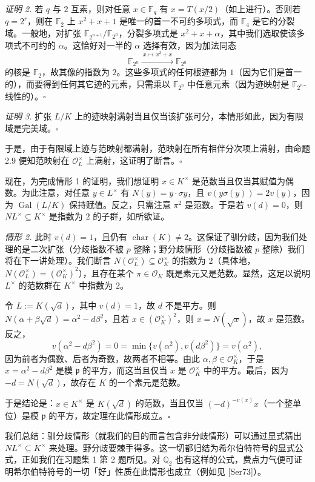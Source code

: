 \textit{证明 2.} 若 $q$ 与 $2$ 互素，则对任意 $x\in\mathbb{F}_q$ 有 $x=T(x/2)$（如上进行）。否则若 $q=2^r$，则在 $\mathbb{F}_2$ 上 $x^2+x+1$ 是唯一的首一不可约多项式，而 $\mathbb{F}_4$ 是它的分裂域。一般地，对扩张 $\mathbb{F}_{2^{n+1}}/\mathbb{F}_{2^n}$，分裂多项式是 $x^2+x+\alpha$，其中我们选取使该多项式不可约的 $\alpha$。这恰好对一半的 $\alpha$ 选择有效，因为加法同态
\[
  \mathbb{F}_{2^n}\xrightarrow{\ x\mapsto x^2+x\ }\mathbb{F}_{2^n}
\]
的核是 $\mathbb{F}_2$，故其像的指数为 $2$。这些多项式的任何根迹都为 $1$（因为它们是首一的），而要得到任何其它迹的元素，只需乘以 $\mathbb{F}_{2^n}$ 中任意元素（因为迹映射是 $\mathbb{F}_{2^n}$-线性的）。\hfill$\square$

\textit{证明 3.} 扩张 $L/K$ 上的迹映射满射当且仅当该扩张可分，本情形如此，因为有限域是完美域。\hfill$\square$

于是，由于有限域上迹与范映射都满射，范映射在所有相伴分次项上满射，由命题 2.9 便知范映射在 $\mathcal{O}_L^{\times}$ 上满射，这证明了断言。\hfill$\square$

现在，为完成情形 1 的证明，我们想证明 $x\in K^{\times}$ 是范数当且仅当其赋值为偶数。为此注意，对任意 $y\in L^{\times}$ 有 $N(y)=y\cdot\sigma y$，且 $v(y\sigma(y))=2v(y)$，因为 $\operatorname{Gal}(L/K)$ 保持赋值。反之，只需注意 $\pi^2$ 是范数。于是若 $v(d)=0$，则 $NL^{\times}\subseteq K^{\times}$ 是指数为 $2$ 的子群，如所欲证。

\emph{情形 2.} 此时 $v(d)=1$，且仍有 $\operatorname{char}(K)\neq 2$。这保证了驯分歧，因为我们处理的是二次扩张（分歧指数不被 $p$ 整除；野分歧情形（分歧指数被 $p$ 整除）我们将在下一讲处理）。我们断言 $N(\mathcal{O}_L^{\times})\subseteq\mathcal{O}_K^{\times}$ 的指数为 $2$（具体地，$N(\mathcal{O}_L^{\times})=(\mathcal{O}_K^{\times})^2$），且存在某个 $\pi\in\mathcal{O}_K$ 既是素元又是范数。显然，这足以说明 $L^{\times}$ 的范数群在 $K^{\times}$ 中指数为 $2$。

令 $L:=K(\sqrt{d})$，其中 $v(d)=1$，故 $d$ 不是平方。则 $N(\alpha+\beta\sqrt{d})=\alpha^2-d\beta^2$，且若 $x\in(\mathcal{O}_K^{\times})^2$，则 $x=N(\sqrt{x})$，故 $x$ 是范数。反之，
\[
  v(\alpha^2-d\beta^2)=0=\min\{v(\alpha^2),v(d\beta^2)\}=v(\alpha^2),
\]
因为前者为偶数、后者为奇数，故两者不相等。由此 $\alpha,\beta\in\mathcal{O}_K^{\times}$，于是 $x=\alpha^2-d\beta^2$ 是模 $\mathfrak{p}$ 的平方，而这当且仅当 $x$ 是 $\mathcal{O}_K^{\times}$ 中的平方。最后，因为 $-d=N(\sqrt{d})$，故存在 $K$ 的一个素元是范数。

于是结论是：$x\in K^{\times}$ 是 $K(\sqrt{d})$ 的范数，当且仅当 $(-d)^{-v(x)}x$（一个整单位）是模 $\mathfrak{p}$ 的平方，故定理在此情形成立。\hfill$\square$

我们总结：驯分歧情形（就我们的目的而言包含非分歧情形）可以通过显式猜出 $NL^{\times}\subseteq K^{\times}$ 来处理。野分歧要棘手得多。这一切都归结为希尔伯特符号的显式公式，正如我们在习题集 1 第 2 题所见。对 $\mathbb{Q}_2$ 也有这样的公式，费点力气便可证明希尔伯特符号的一切「好」性质在此情形也成立（例如见 [Ser73]）。
